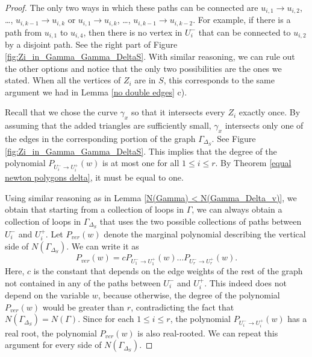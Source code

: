 \documentclass[10pt,a4paper]{amsart}
\begin{document}
\begin{proof}
    The only two ways in which these paths can be connected are $u_{i,1} \rightarrow u_{i,2}$, \dots, $u_{i,k-1} \rightarrow u_{i,k}$ or $u_{i,1} \rightarrow u_{i,k}$, \dots, $u_{i,k-1} \rightarrow u_{i,k-2}$. For example, if there is a path from $u_{i,1}$ to $u_{i,4}$, then there is no vertex in $U^-_{i}$ that can be connected to $u_{i,2}$ by a disjoint path. See the right part of Figure \ref{fig:Zi_in_Gamma_Gamma_DeltaS}. With similar reasoning, we can rule out the other options and notice that the only two possibilities are the ones we stated. When all the vertices of $Z_i$ are in $S$, this corresponds to the same argument we had in Lemma \ref{no double edges} c).

    Recall that we chose the curve $\gamma_x$ so that it intersects every $Z_i$ exactly once. By assuming that the added triangles are sufficiently small, $\gamma_x$ intersects only one of the edges in the corresponding portion of the graph $\Gamma_{\Delta_S}$. See Figure \ref{fig:Zi_in_Gamma_Gamma_DeltaS}. This implies that the degree of the polynomial $P_{U^-_{i} \to U^+_{i}}(w)$ is at most one for all $1 \leq i \leq r$. By Theorem \ref{equal newton polygons delta}, it must be equal to one.

    Using similar reasoning as in Lemma \ref{N(Gamma) < N(Gamma_Delta_v)}, we obtain that starting from a collection of loops in $\Gamma$, we can always obtain a collection of loops in $\Gamma_{\Delta_S}$ that uses the two possible collections of paths between $U^-_{i}$ and $U^+_{i}$. Let $P_{ver}(w)$ denote the marginal polynomial describing the vertical side of $N(\Gamma_{\Delta_S})$. We can write it as
    \[P_{ver}(w) = c P_{U^-_{1} \to U^+_{1}}(w) \dots P_{U^-_{r} \to U^+_{r}}(w).\]
    Here, $c$ is the constant that depends on the edge weights of the rest of the graph not contained in any of the paths between $U^-_{i}$ and $U^+_{i}$. This indeed does not depend on the variable $w$, because otherwise, the degree of the polynomial $P_{ver}(w)$ would be greater than $r$, contradicting the fact that $N(\Gamma_{\Delta_S}) = N(\Gamma)$. Since for each $1 \leq i \leq r$, the polynomial $P_{U^-_{i} \to U^+_{i}}(w)$ has a real root, the polynomial $P_{ver}(w)$ is also real-rooted. We can repeat this argument for every side of $N(\Gamma_{\Delta_S})$.
\end{proof}
\end{document}
